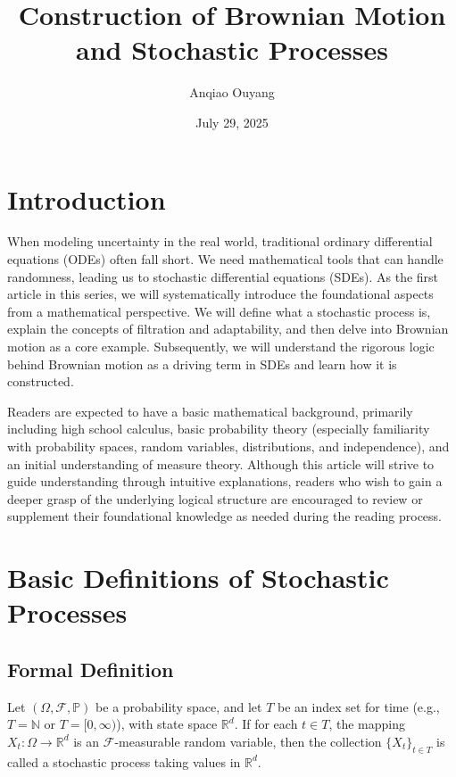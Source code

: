 \documentclass{article}
\title{Construction of Brownian Motion and Stochastic Processes}
\author{Anqiao Ouyang}
\date{July 29, 2025}
\begin{document}
\maketitle

\section{Introduction}

When modeling uncertainty in the real world, traditional ordinary differential equations (ODEs) often fall short. We need mathematical tools that can handle randomness, leading us to stochastic differential equations (SDEs). As the first article in this series, we will systematically introduce the foundational aspects from a mathematical perspective. We will define what a stochastic process is, explain the concepts of filtration and adaptability, and then delve into Brownian motion as a core example. Subsequently, we will understand the rigorous logic behind Brownian motion as a driving term in SDEs and learn how it is constructed.

Readers are expected to have a basic mathematical background, primarily including high school calculus, basic probability theory (especially familiarity with probability spaces, random variables, distributions, and independence), and an initial understanding of measure theory. Although this article will strive to guide understanding through intuitive explanations, readers who wish to gain a deeper grasp of the underlying logical structure are encouraged to review or supplement their foundational knowledge as needed during the reading process.

\section{Basic Definitions of Stochastic Processes}

\subsection{Formal Definition}

\begin{definition}
Let $(\Omega, \mathcal{F}, \mathbb{P})$ be a probability space, and let $T$ be an index set for time (e.g., $T = \mathbb{N}$ or $T = [0, \infty)$), with state space $\mathbb{R}^d$. If for each $t \in T$, the mapping $X_t : \Omega \to \mathbb{R}^d$ is an $\mathcal{F}$-measurable random variable, then the collection $\{X_t\}_{t \in T}$ is called a stochastic process taking values in $\mathbb{R}^d$.
\end{definition}
\end{document}
